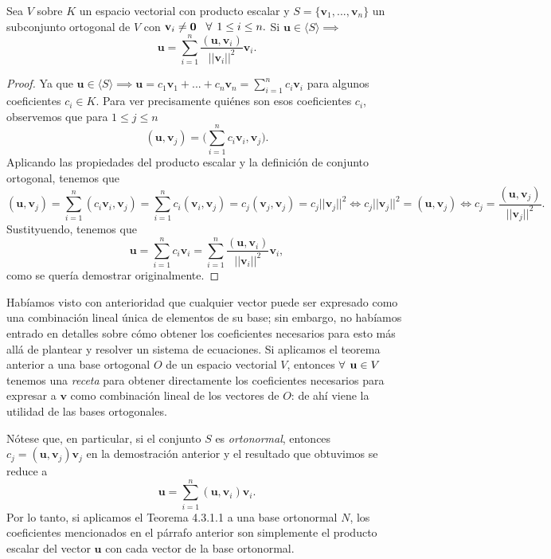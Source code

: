 \documentclass[12pt]{article}
\newenvironment{teorema}[2][Teorema]{\begin{trivlist}
\item[\hskip \labelsep {\bfseries #1}\hskip \labelsep {\bfseries #2.}]}{\end{trivlist}}
\begin{document}
\begin{teorema} {4.3.1.1}
Sea $V$ sobre $K$ un espacio vectorial con producto escalar y $S=\{\mathbf{v}_1, ..., \mathbf{v}_n\}$ un subconjunto ortogonal de $V$ con $\mathbf{v}_i\neq\mathbf{0}\hspace{3mm}\forall\hspace{1.5mm} 1\leq i\leq n.$ Si $\mathbf{u}\in \langle S \rangle \implies$ $$\mathbf{u} = \sum_{i=1}^n \frac{(\mathbf{u},\mathbf{v}_i)}{||\mathbf{v}_i||^2}\mathbf{v}_i.$$

\begin{proof}
    Ya que $\mathbf{u}\in\langle S \rangle \implies \mathbf{u}=c_1\mathbf{v}_1+...+c_n\mathbf{v}_n=\sum_{i=1}^n c_i\mathbf{v}_i$ para algunos coeficientes $c_i\in K$. Para ver precisamente quiénes son esos coeficientes $c_i$, observemos que para $1\leq j\leq n$ $$(\mathbf{u},\mathbf{v}_j)=\big ( \sum_{i=1}^n c_i\mathbf{v}_i, \mathbf{v}_j \big ).$$ \noindent Aplicando las propiedades del producto escalar y la definición de conjunto ortogonal, tenemos que $$(\mathbf{u},\mathbf{v}_j)=\sum_{i=1}^n (c_i\mathbf{v}_i, \mathbf{v}_j)= \sum_{i=1}^n c_i(\mathbf{v}_i,\mathbf{v}_j)=c_j(\mathbf{v}_j,\mathbf{v}_j)=c_j||\mathbf{v}_j||^2\iff c_j||\mathbf{v}_j||^2=(\mathbf{u},\mathbf{v}_j)\iff c_j=\frac{(\mathbf{u},\mathbf{v}_j)}{||\mathbf{v}_j||^2}.$$ Sustityuendo, tenemos que \[
        \mathbf{u}=\sum_{i=1}^n c_i \mathbf{v}_i=\sum_{i=1}^n \frac{(\mathbf{u},\mathbf{v}_i)}{||\mathbf{v}_i||^2}\mathbf{v}_i
    ,\] \noindent como se quería demostrar originalmente. 
\end{proof}

Habíamos visto con anterioridad que cualquier vector puede ser expresado como una combinación lineal única de elementos de su base; sin embargo, no habíamos entrado en detalles sobre cómo obtener los coeficientes necesarios para esto más allá de plantear y resolver un sistema de ecuaciones. Si aplicamos el teorema anterior a una base ortogonal $O$ de un espacio vectorial $V$, entonces $\forall\hspace{1.5mm} \mathbf{u}\in V $ tenemos una \emph{receta} para obtener directamente los coeficientes necesarios para expresar a $\mathbf{v}$ como combinación lineal de los vectores de $O$: de ahí viene la utilidad de las bases ortogonales.

    Nótese que, en particular, si el conjunto $S$ es \emph{ortonormal}, entonces $c_j=(\mathbf{u},\mathbf{v}_j)\mathbf{v}_j$ en la demostración anterior y el resultado que obtuvimos se reduce a \[
        \mathbf{u} = \sum_{i=1}^n (\mathbf{u},\mathbf{v}_i)\mathbf{v}_i
    .\] \noindent Por lo tanto, si aplicamos el Teorema 4.3.1.1 a una base ortonormal $N$, los coeficientes mencionados en el párrafo anterior son simplemente el producto escalar del vector $\mathbf{u}$ con cada vector de la base ortonormal.

\end{teorema}
\end{document}
